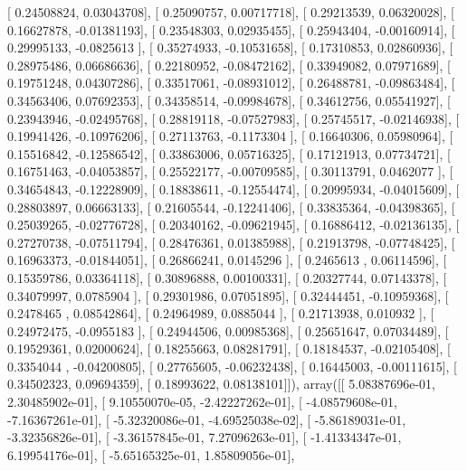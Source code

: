 \documentclass{article}
\begin{document}
       [ 0.24508824,  0.03043708],
       [ 0.25090757,  0.00717718],
       [ 0.29213539,  0.06320028],
       [ 0.16627878, -0.01381193],
       [ 0.23548303,  0.02935455],
       [ 0.25943404, -0.00160914],
       [ 0.29995133, -0.0825613 ],
       [ 0.35274933, -0.10531658],
       [ 0.17310853,  0.02860936],
       [ 0.28975486,  0.06686636],
       [ 0.22180952, -0.08472162],
       [ 0.33949082,  0.07971689],
       [ 0.19751248,  0.04307286],
       [ 0.33517061, -0.08931012],
       [ 0.26488781, -0.09863484],
       [ 0.34563406,  0.07692353],
       [ 0.34358514, -0.09984678],
       [ 0.34612756,  0.05541927],
       [ 0.23943946, -0.02495768],
       [ 0.28819118, -0.07527983],
       [ 0.25745517, -0.02146938],
       [ 0.19941426, -0.10976206],
       [ 0.27113763, -0.1173304 ],
       [ 0.16640306,  0.05980964],
       [ 0.15516842, -0.12586542],
       [ 0.33863006,  0.05716325],
       [ 0.17121913,  0.07734721],
       [ 0.16751463, -0.04053857],
       [ 0.25522177, -0.00709585],
       [ 0.30113791,  0.0462077 ],
       [ 0.34654843, -0.12228909],
       [ 0.18838611, -0.12554474],
       [ 0.20995934, -0.04015609],
       [ 0.28803897,  0.06663133],
       [ 0.21605544, -0.12241406],
       [ 0.33835364, -0.04398365],
       [ 0.25039265, -0.02776728],
       [ 0.20340162, -0.09621945],
       [ 0.16886412, -0.02136135],
       [ 0.27270738, -0.07511794],
       [ 0.28476361,  0.01385988],
       [ 0.21913798, -0.07748425],
       [ 0.16963373, -0.01844051],
       [ 0.26866241,  0.0145296 ],
       [ 0.2465613 ,  0.06114596],
       [ 0.15359786,  0.03364118],
       [ 0.30896888,  0.00100331],
       [ 0.20327744,  0.07143378],
       [ 0.34079997,  0.0785904 ],
       [ 0.29301986,  0.07051895],
       [ 0.32444451, -0.10959368],
       [ 0.2478465 ,  0.08542864],
       [ 0.24964989,  0.0885044 ],
       [ 0.21713938,  0.010932  ],
       [ 0.24972475, -0.0955183 ],
       [ 0.24944506,  0.00985368],
       [ 0.25651647,  0.07034489],
       [ 0.19529361,  0.02000624],
       [ 0.18255663,  0.08281791],
       [ 0.18184537, -0.02105408],
       [ 0.3354044 , -0.04200805],
       [ 0.27765605, -0.06232438],
       [ 0.16445003, -0.00111615],
       [ 0.34502323,  0.09694359],
       [ 0.18993622,  0.08138101]]), array([[  5.08387696e-01,   2.30485902e-01],
       [  9.10550070e-05,  -2.42227262e-01],
       [ -4.08579608e-01,  -7.16367261e-01],
       [ -5.32320086e-01,  -4.69525038e-02],
       [ -5.86189031e-01,  -3.32356826e-01],
       [ -3.36157845e-01,   7.27096263e-01],
       [ -1.41334347e-01,   6.19954176e-01],
       [ -5.65165325e-01,   1.85809056e-01],
\end{document}
